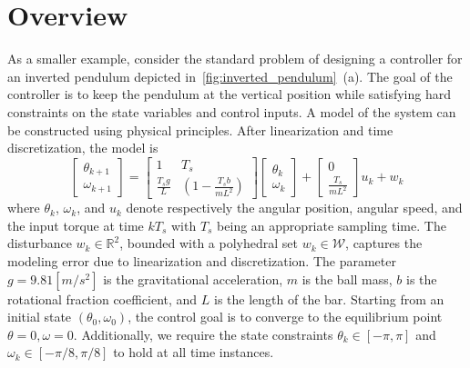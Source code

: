 \section{Overview}
\label{sec:example}


As a smaller example, consider the standard problem of designing a controller for an inverted pendulum depicted in~\autoref{fig:inverted_pendulum}~{(a)}.
The goal of the controller is to keep the pendulum at the vertical position while satisfying hard constraints on the state variables and control inputs.
A model of the system can be constructed using physical principles. 
After linearization and time discretization, the model is
	\begin{equation}
		\begin{bmatrix}
			 \theta_{k+1}\\
			\omega_{k+1}
		\end{bmatrix}=
		\begin{bmatrix}
			1 & T_s\\
			\frac{T_sg}{L}& (1-\frac{T_sb}{mL^2})		
		\end{bmatrix}
		\begin{bmatrix}
			\theta_k\\
			\omega_k
		\end{bmatrix}+
		\begin{bmatrix}
			0\\
			\frac{T_s}{mL^2}
		\end{bmatrix}u_k + w_k
		\label{eq:pendul_ss}
	\end{equation}
where $\theta_k$, $\omega_k$, and $u_k$ denote respectively the angular position, angular speed, 
and the input torque at time $kT_s$ with $T_s$ being an appropriate sampling time.
The disturbance $w_k\in\mathbb R^2$, bounded with a polyhedral set $w_k\in \mathcal W$, captures the modeling error due to 
linearization and discretization. 
The parameter $g=9.81 [m/s^2]$ is the gravitational acceleration, $m$ is the ball mass, $b$ is the rotational fraction coefficient, 
and $L$ is the length of the bar. 
Starting from an initial state $(\theta_0,\omega_0)$, the control goal is to converge to the equilibrium point 
$\theta=0, \omega=0$.
Additionally, we require the state constraints $\theta_k\in[-\pi,\pi]$ and $\omega_k\in[-\pi/8,\pi/8]$ to hold at all time instances.

